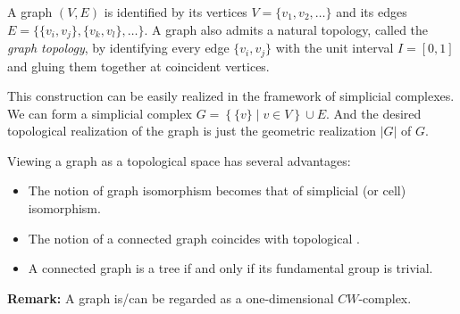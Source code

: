 \documentclass[12pt]{article}
\begin{document}
A graph $(V,E)$ is identified by its vertices $V=\{v_1,v_2,\ldots\}$ and its
edges $E=\{\{v_i,v_j\},\{v_k,v_l\},\ldots\}$. A graph also admits a natural
topology, called the \emph{graph topology}, by identifying every edge
$\{v_i,v_j\}$ with the unit interval $I=[0,1]$ and gluing them together at
coincident vertices.

This construction can be easily realized in the framework of simplicial
complexes. We can form a simplicial complex $G=\left\{\{v\}\mid v\in V\right\} \cup
E$. And the desired topological realization of the graph is just the
geometric realization $|G|$ of $G$.

Viewing a graph as a topological space has several advantages:
\begin{itemize}
\item The notion of graph isomorphism becomes that of simplicial (or cell)  isomorphism.
\item The notion of a connected graph coincides with topological
  .
\item A connected graph is a tree if and only if its fundamental group is trivial.
\end{itemize}

{\bf Remark:}
A graph is/can be regarded as a one-dimensional $CW$-complex.
\end{document}
